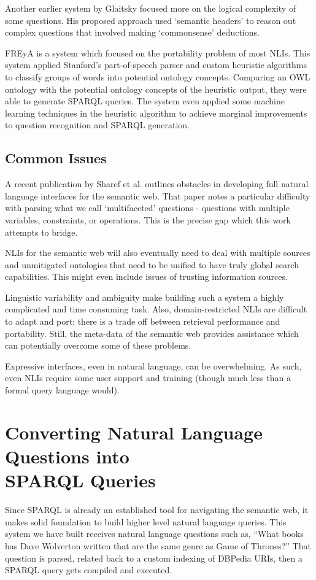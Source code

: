 \documentclass[11pt]{article}
\begin{document}
Another earlier system by Glaitsky\cite{galitsky2} focused more on the logical complexity
of some questions. His proposed approach used `semantic headers' to reason out
complex questions that involved making `commonsense' deductions.

FREyA\cite{freya} is a system which focused on the portability problem of most
NLIs. This system applied Stanford's part-of-speech parser and custom heuristic algorithms
to classify groups of words into potential ontology concepts. Comparing an OWL ontology
with the potential ontology concepts of the heuristic output, they were able to generate
SPARQL queries. The system even applied some machine learning techniques in the 
heuristic algorithm to achieve marginal improvements to question recognition and SPARQL
generation. 

\subsection{Common Issues}
A recent publication by Sharef et al. \cite{issues} outlines obstacles in developing full
natural language interfaces for the semantic web. That paper notes a particular
difficulty with parsing what we call `multifaceted' questions - questions with multiple
variables, constraints, or operations. This is the precise gap which this work
attempts to bridge.

NLIs for the semantic web will also eventually need to deal with multiple sources
and unmitigated ontologies that need to be unified to have truly global search
capabilities\cite{issues}. This might even include issues of trusting information
sources\cite{semantic}.

Linguistic variability and ambiguity make building such a
system a highly complicated and time consuming task. Also,
domain-restricted NLIs are difficult to adapt and port:
there is a trade off between retrieval performance and portability. 
Still, the meta-data of the semantic web provides assistance
which can potentially overcome some of these problems. \cite{usability}

Expressive interfaces, even in natural language, can be overwhelming.
As such, even NLIs require some user support and training (though much less than
a formal query language would). \cite{usability}

\section{Converting Natural Language Questions into \\SPARQL Queries}
Since SPARQL is already an established tool for navigating the semantic
web, it makes solid foundation to build higher level natural language queries.
This system we have built receives natural language questions such as, 
``What books has Dave Wolverton written that are the same genre as Game of Thrones?''
That question is parsed, related back to a custom indexing of DBPedia URIs, then
a SPARQL query gets compiled and executed.
\end{document}
